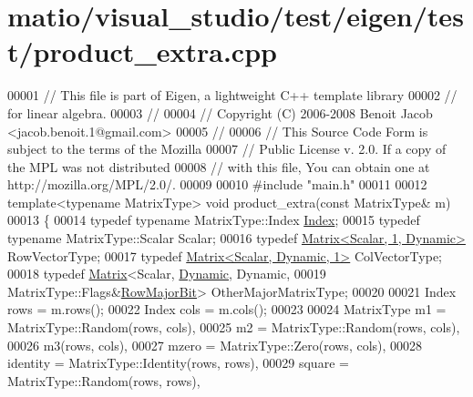 \hypertarget{matio_2visual__studio_2test_2eigen_2test_2product__extra_8cpp_source}{}\section{matio/visual\+\_\+studio/test/eigen/test/product\+\_\+extra.cpp}
\label{matio_2visual__studio_2test_2eigen_2test_2product__extra_8cpp_source}

\begin{DoxyCode}
00001 \textcolor{comment}{// This file is part of Eigen, a lightweight C++ template library}
00002 \textcolor{comment}{// for linear algebra.}
00003 \textcolor{comment}{//}
00004 \textcolor{comment}{// Copyright (C) 2006-2008 Benoit Jacob <jacob.benoit.1@gmail.com>}
00005 \textcolor{comment}{//}
00006 \textcolor{comment}{// This Source Code Form is subject to the terms of the Mozilla}
00007 \textcolor{comment}{// Public License v. 2.0. If a copy of the MPL was not distributed}
00008 \textcolor{comment}{// with this file, You can obtain one at http://mozilla.org/MPL/2.0/.}
00009 
00010 \textcolor{preprocessor}{#include "main.h"}
00011 
00012 \textcolor{keyword}{template}<\textcolor{keyword}{typename} MatrixType> \textcolor{keywordtype}{void} product\_extra(\textcolor{keyword}{const} MatrixType& m)
00013 \{
00014   \textcolor{keyword}{typedef} \textcolor{keyword}{typename} MatrixType::Index \hyperlink{namespace_eigen_a62e77e0933482dafde8fe197d9a2cfde}{Index};
00015   \textcolor{keyword}{typedef} \textcolor{keyword}{typename} MatrixType::Scalar Scalar;
00016   \textcolor{keyword}{typedef} \hyperlink{group___core___module_class_eigen_1_1_matrix}{Matrix<Scalar, 1, Dynamic>} RowVectorType;
00017   \textcolor{keyword}{typedef} \hyperlink{group___core___module}{Matrix<Scalar, Dynamic, 1>} ColVectorType;
00018   \textcolor{keyword}{typedef} \hyperlink{group___core___module_class_eigen_1_1_matrix}{Matrix}<Scalar, \hyperlink{namespace_eigen_ad81fa7195215a0ce30017dfac309f0b2}{Dynamic}, Dynamic,
00019                          MatrixType::Flags&\hyperlink{group__flags_gae4f56c2a60bbe4bd2e44c5b19cbe8762}{RowMajorBit}> OtherMajorMatrixType;
00020 
00021   Index rows = m.rows();
00022   Index cols = m.cols();
00023 
00024   MatrixType m1 = MatrixType::Random(rows, cols),
00025              m2 = MatrixType::Random(rows, cols),
00026              m3(rows, cols),
00027              mzero = MatrixType::Zero(rows, cols),
00028              identity = MatrixType::Identity(rows, rows),
00029              square = MatrixType::Random(rows, rows),

\end{DoxyCode}
